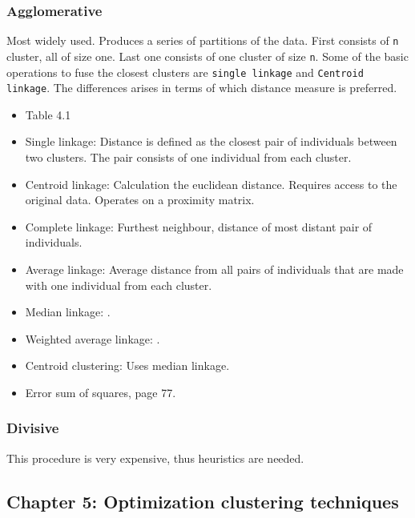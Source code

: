 \documentclass[a4paper,10pt]{article}
\begin{document}
\subsubsection{Agglomerative}
Most widely used. Produces a series of partitions of the data. First consists of \texttt{n} cluster, all of size one. Last one consists of one cluster of size \texttt{n}. Some of the basic operations to fuse the closest clusters are \texttt{single linkage} and \texttt{Centroid linkage}. The differences arises in terms of which distance measure is preferred.

\begin{itemize}
	\item Table 4.1
	\item Single linkage: Distance is defined as the closest pair of individuals between two clusters. The pair consists of one individual from each cluster.
	\item Centroid linkage: Calculation the euclidean distance. Requires access to the original data. Operates on a proximity matrix.
	\item Complete linkage: Furthest neighbour, distance of most distant pair of individuals.
	\item Average linkage: Average distance from all pairs of individuals that are made with one individual from each cluster.
	\item Median linkage: .	
	\item Weighted average linkage: .
	\item Centroid clustering: Uses median linkage.
	\item Error sum of squares, page 77.
\end{itemize}

\subsubsection{Divisive}
This procedure is very expensive, thus heuristics are needed.


\subsection{Chapter 5: Optimization clustering techniques}
\end{document}
